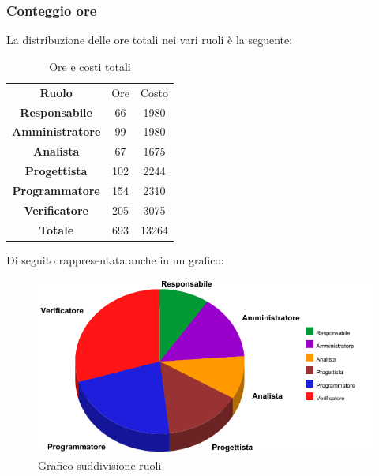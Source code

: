 	\subsubsection{Conteggio ore}
		La distribuzione delle ore totali nei vari ruoli è la seguente:
		
		\begin{table}[!htpb]
				\centering
			\renewcommand{\arraystretch}{1.8} 
			\begin{tabular}{| c c c|}
				\rowcolor{orange!50}
				\hline
				\multicolumn{3}{|c|}{\textbf{Suddivisione delle ore nei vari ruoli}}\\
				\hline
				\textbf{Ruolo} 			& Ore 	& Costo\\
				\hline
				\textbf{Responsabile}	&66 	&1980\\
				\hline
				\textbf{Amministratore}	&99 	&1980\\
				\hline
				\textbf{Analista}		&67 	&1675\\
				\hline
				\textbf{Progettista}	&102 	&2244\\
				\hline
				\textbf{Programmatore}	&154 	&2310\\
				\hline
				\textbf{Verificatore} 	&205 	&3075\\
				\hline
				\textbf{Totale} 		&693	&13264\\
				\hline 
			\end{tabular}
			\caption{Ore e costi totali }
		\end{table}
		Di seguito rappresentata anche in un grafico:
		\begin{figure}[!htpb]
			\centering
			\includegraphics[scale=0.8]{preventivo/torta_totali.png}
			\caption{Grafico suddivisione ruoli}
		\end{figure}
	\clearpage

